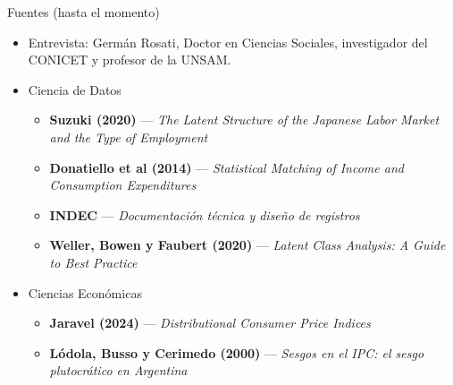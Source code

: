\documentclass{beamer}
\begin{document}
\begin{frame}{Fuentes (hasta el momento)}
    \begin{itemize}
        \item Entrevista: \small Germán Rosati, Doctor en Ciencias Sociales, investigador del CONICET y profesor de la UNSAM.
        \item Ciencia de Datos
        \begin{itemize}
            \item \textbf{Suzuki (2020)} --- \textit{The Latent Structure of the Japanese Labor Market and the Type of Employment}
                \vspace{0.4em}
            \item \textbf{Donatiello et al (2014)} --- \textit{Statistical Matching of Income and Consumption Expenditures}
                \vspace{0.4em}
            \item \textbf{INDEC} --- \textit{Documentación técnica y diseño de registros}
                \vspace{0.4em}
            \item \textbf{Weller, Bowen y Faubert (2020)} --- \textit{Latent Class Analysis: A Guide to Best Practice}
                \vspace{0.8em}
        \end{itemize}
        \item Ciencias Económicas
        \begin{itemize}
            \item \textbf{Jaravel (2024)} --- \textit{Distributional Consumer Price Indices}
              \vspace{0.4em}
            \item \textbf{Lódola, Busso y Cerimedo (2000)} --- \textit{Sesgos en el IPC: el sesgo plutocrático en Argentina}
        \end{itemize}
    \end{itemize}
\end{frame}
\end{document}
